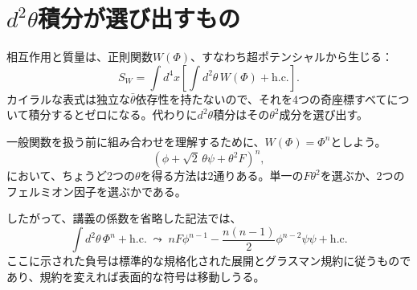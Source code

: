 \section{\texorpdfstring{\(d^2\theta\)}{d2-theta}積分が選び出すもの}

相互作用と質量は、正則関数\(W(\Phi)\)、すなわち超ポテンシャルから生じる：
\begin{equation}
S_W
=
\int d^4x
\left[
\int d^2\theta\,W(\Phi)
+\mathrm{h.c.}
\right].
\label{eq:l9-superpotential-action}
\end{equation}
カイラルな表式は独立な\(\bar\theta\)依存性を持たないので、それを4つの奇座標すべてについて積分するとゼロになる。代わりに\(d^2\theta\)積分はその\(\theta^2\)成分を選び出す。

一般関数を扱う前に組み合わせを理解するために、\(W(\Phi)=\Phi^n\)としよう。
\begin{equation}
(\phi+\sqrt2\,\theta\psi+\theta^2F)^n,
\end{equation}
において、ちょうど2つの\(\theta\)を得る方法は2通りある。単一の\(F\theta^2\)を選ぶか、2つのフェルミオン因子を選ぶかである。

\begin{classroomqa}
\end{classroomqa}

\begin{classroomqa}
\end{classroomqa}

したがって、講義の係数を省略した記法では、
\begin{equation}
\int d^2\theta\,\Phi^n+\mathrm{h.c.}
\;\leadsto\;
nF\phi^{n-1}
-\frac{n(n-1)}{2}\phi^{n-2}\psi\psi
+\mathrm{h.c.}
\label{eq:l9-power-extraction}
\end{equation}
ここに示された負号は標準的な規格化された展開とグラスマン規約に従うものであり、規約を変えれば表面的な符号は移動しうる。

\begin{classroomqa}
\end{classroomqa}

